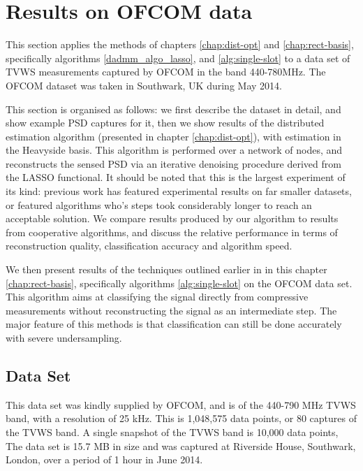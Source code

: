 \clearpage

\section{Results on OFCOM data}
\label{ofcom-results}

This section applies the methods of chapters \ref{chap:dist-opt} and \ref{chap:rect-basis}, specifically algorithms \ref{dadmm_algo_lasso}, and \ref{alg:single-slot} to a data set of TVWS measurements captured by OFCOM in the band 440-780MHz. The OFCOM dataset was taken in Southwark, UK during May 2014.

This section is organised as follows: we first describe the dataset in detail, and show example PSD captures for it, then we show results of the distributed estimation algorithm (presented in chapter \eqref{chap:dist-opt}), with estimation in the Heavyside basis. This algorithm is performed over a network of nodes, and reconstructs the sensed PSD via an iterative denoising procedure derived from the LASSO functional. It should be noted that this is the largest experiment of its kind: previous work has featured experimental results on far smaller datasets, or featured algorithms who's steps took considerably longer to reach an acceptable solution. We compare results produced by our algorithm to results from cooperative algorithms, and discuss the relative performance in terms of reconstruction quality, classification accuracy and algorithm speed. 

We then present results of the techniques outlined earlier in in this chapter \eqref{chap:rect-basis}, specifically algorithms \ref{alg:single-slot} on the OFCOM data set. This algorithm aims at classifying the signal directly from compressive measurements without reconstructing the signal as an intermediate step. The major feature of this methods is that classification can still be done accurately with severe undersampling.

\subsection{Data Set}

This data set was kindly supplied by OFCOM, and is of the 440-790 MHz TVWS band, with a resolution of 25 kHz. This is 1,048,575 data points, or 80 captures of the TVWS band. A single snapshot of the TVWS band is 10,000 data points,  The data set is 15.7 MB in size and was captured at Riverside House, Southwark, London, over a period of 1 hour in June 2014. 

